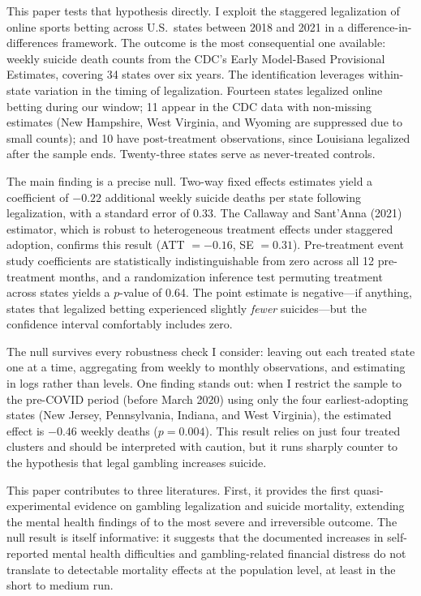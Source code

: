\documentclass[12pt]{article}
\begin{document}
This paper tests that hypothesis directly. I exploit the staggered legalization of online sports betting across U.S.\ states between 2018 and 2021 in a difference-in-differences framework. The outcome is the most consequential one available: weekly suicide death counts from the CDC's Early Model-Based Provisional Estimates, covering 34 states over six years. The identification leverages within-state variation in the timing of legalization. Fourteen states legalized online betting during our window; 11 appear in the CDC data with non-missing estimates (New Hampshire, West Virginia, and Wyoming are suppressed due to small counts); and 10 have post-treatment observations, since Louisiana legalized after the sample ends. Twenty-three states serve as never-treated controls.

The main finding is a precise null. Two-way fixed effects estimates yield a coefficient of $-0.22$ additional weekly suicide deaths per state following legalization, with a standard error of 0.33. The Callaway and Sant'Anna (2021) estimator, which is robust to heterogeneous treatment effects under staggered adoption, confirms this result (ATT $= -0.16$, SE $= 0.31$). Pre-treatment event study coefficients are statistically indistinguishable from zero across all 12 pre-treatment months, and a randomization inference test permuting treatment across states yields a $p$-value of 0.64. The point estimate is negative---if anything, states that legalized betting experienced slightly \textit{fewer} suicides---but the confidence interval comfortably includes zero.

The null survives every robustness check I consider: leaving out each treated state one at a time, aggregating from weekly to monthly observations, and estimating in logs rather than levels. One finding stands out: when I restrict the sample to the pre-COVID period (before March 2020) using only the four earliest-adopting states (New Jersey, Pennsylvania, Indiana, and West Virginia), the estimated effect is $-0.46$ weekly deaths ($p = 0.004$). This result relies on just four treated clusters and should be interpreted with caution, but it runs sharply counter to the hypothesis that legal gambling increases suicide.

This paper contributes to three literatures. First, it provides the first quasi-experimental evidence on gambling legalization and suicide mortality, extending the mental health findings of \citet{humphreys2024} to the most severe and irreversible outcome. The null result is itself informative: it suggests that the documented increases in self-reported mental health difficulties \citep{humphreys2024} and gambling-related financial distress \citep{hollenbeck2025} do not translate to detectable mortality effects at the population level, at least in the short to medium run.
\end{document}
